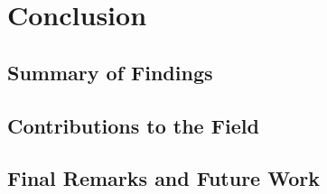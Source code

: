 \section*{Conclusion}

\subsection{Summary of Findings}
\label{sec:Summary of Findings}

\subsection{Contributions to the Field}
\label{sec:Contributions to the Field}

\subsection{Final Remarks and Future Work}
\label{sec:Final Remarks and Future Work}